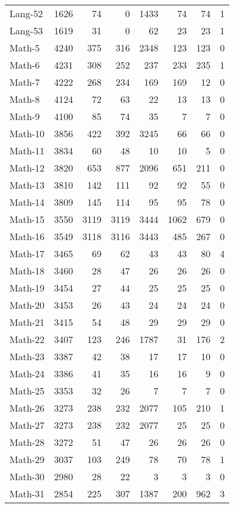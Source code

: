 \begin{footnotesize}
\begin{longtable}{lrrrrrrc}
Lang-52 &  1626 & 74 & 0 & 1433 & 74  & 74 & 1\\
Lang-53 &  1619 & 31 & 0 & 62 & 23  & 23 & 1\\
Math-5 &  4240 & 375 & 316 & 2348 & 123  & 123 & 0\\
Math-6 &  4231 & 308 & 252 & 237 & 233  & 235 & 1\\
Math-7 &  4222 & 268 & 234 & 169 & 169  & 12 & 0\\
Math-8 &  4124 & 72 & 63 & 22 & 13  & 13 & 0\\
Math-9 &  4100 & 85 & 74 & 35 & 7  & 7 & 0\\
Math-10 &  3856 & 422 & 392 & 3245 & 66  & 66 & 0\\
Math-11 &  3834 & 60 & 48 & 10 & 10  & 5 & 0\\
Math-12 &  3820 & 653 & 877 & 2096 & 651  & 211 & 0\\
Math-13 &  3810 & 142 & 111 & 92 & 92  & 55 & 0\\
Math-14 &  3809 & 145 & 114 & 95 & 95  & 78 & 0\\
Math-15 &  3550 & 3119 & 3119 & 3444 & 1062  & 679 & 0\\
Math-16 &  3549 & 3118 & 3116 & 3443 & 485  & 267 & 0\\
Math-17 &  3465 & 69 & 62 & 43 & 43  & 80 & 4\\
Math-18 &  3460 & 28 & 47 & 26 & 26  & 26 & 0\\
Math-19 &  3454 & 27 & 44 & 25 & 25  & 25 & 0\\
Math-20 &  3453 & 26 & 43 & 24 & 24  & 24 & 0\\
Math-21 &  3415 & 54 & 48 & 29 & 29  & 29 & 0\\
Math-22 &  3407 & 123 & 246 & 1787 & 31  & 176 & 2\\
Math-23 &  3387 & 42 & 38 & 17 & 17  & 10 & 0\\
Math-24 &  3386 & 41 & 35 & 16 & 16  & 9 & 0\\
Math-25 &  3353 & 32 & 26 & 7 & 7  & 7 & 0\\
Math-26 &  3273 & 238 & 232 & 2077 & 105  & 210 & 1\\
Math-27 &  3273 & 238 & 232 & 2077 & 25  & 25 & 0\\
Math-28 &  3272 & 51 & 47 & 26 & 26  & 26 & 0\\
Math-29 &  3037 & 103 & 249 & 78 & 70  & 78 & 1\\
Math-30 &  2980 & 28 & 22 & 3 & 3  & 3 & 0\\
Math-31 &  2854 & 225 & 307 & 1387 & 200  & 962 & 3\\

\end{longtable}
\end{footnotesize}
